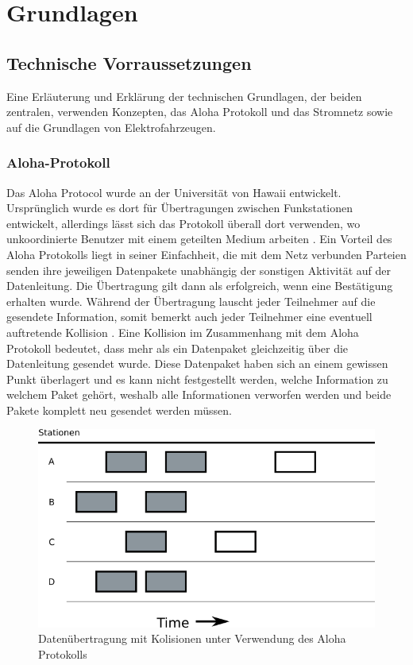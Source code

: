 \chapter{Grundlagen}
\label{chap:grundlagen}

\section{Technische Vorraussetzungen}
Eine Erläuterung und Erklärung der technischen Grundlagen, der beiden zentralen, verwenden Konzepten, das Aloha Protokoll und das Stromnetz sowie auf die Grundlagen von Elektrofahrzeugen.
\subsection{Aloha-Protokoll}
Das Aloha Protocol wurde an der Universität von Hawaii entwickelt. Ursprünglich wurde es dort für Übertragungen zwischen Funkstationen entwickelt, allerdings lässt sich das Protokoll überall dort verwenden, wo unkoordinierte Benutzer mit einem geteilten Medium arbeiten \cite{Back_AlohaPure}. Ein Vorteil des Aloha Protokolls liegt in seiner Einfachheit, die mit dem Netz verbunden Parteien senden ihre jeweiligen Datenpakete unabhängig der sonstigen Aktivität auf der Datenleitung. Die Übertragung gilt dann als erfolgreich, wenn eine Bestätigung erhalten wurde. Während der Übertragung lauscht jeder Teilnehmer auf die gesendete Information, somit bemerkt auch jeder Teilnehmer eine eventuell auftretende Kollision \cite{Back_AlohaPure}. Eine Kollision im Zusammenhang mit dem Aloha Protokoll bedeutet, dass mehr als ein Datenpaket gleichzeitig über die Datenleitung gesendet wurde. Diese Datenpaket haben sich an einem gewissen Punkt überlagert und es kann nicht festgestellt werden, welche Information zu welchem Paket gehört, weshalb alle Informationen verworfen werden und beide Pakete komplett neu gesendet werden müssen. \\
\begin{figure}[h!]
	\begin{center}
	\includegraphics[width=\linewidth]{img/ZeichnungExport2.png}
	\caption{Datenübertragung mit Kolisionen unter Verwendung des Aloha Protokolls}
	\end{center}
	\label{Abb2_PureAloha_2}
\end{figure}

